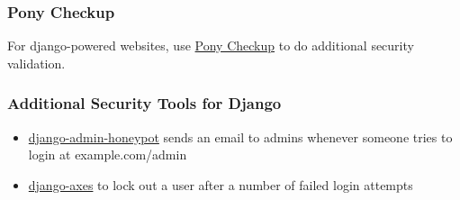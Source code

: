 \documentclass[9pt]{beamer}
\begin{document}
\begin{frame}[fragile]
\frametitle{Pony Checkup}
For django-powered websites, use \href{https://www.ponycheckup.com}{Pony Checkup} to do additional security validation.
\end{frame}

\begin{frame}[fragile]
\frametitle{Additional Security Tools for Django}

\begin{itemize}
\item \href{https://github.com/dmpayton/django-admin-honeypot}{django-admin-honeypot} sends an email to admins whenever someone tries to login at example.com/admin
\item \href{https://pypi.python.org/pypi/django-axes/1.4.0}{django-axes} to lock out a user after a number of failed login attempts
\end{itemize}
\end{frame}
\end{document}
